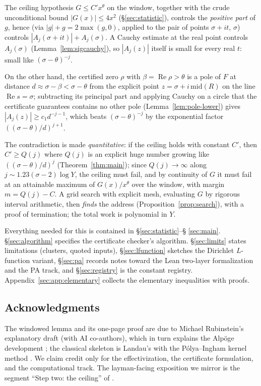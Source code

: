 \documentclass[11pt]{amsart}
\numberwithin{equation}{section}
\newcommand{\re}{\operatorname{Re}}
\newcommand{\Sig}{\sigma}
\begin{document}
The ceiling hypothesis $G \le C'x^{\theta}$ on the window, together with
the crude unconditional bound $|G(x)| \le 4x^2$ (\S\ref{sec:statistic}),
controls the \emph{positive part} of $g$, hence (via
$|g| + g = 2\max(g,0)$, applied to the pair of points
$\Sig+it$, $\Sig$) controls $|A_j(\Sig+it)| + A_j(\Sig)$.
A Cauchy estimate at the real point controls $A_j(\Sig)$
(Lemma~\ref{lem:sigcauchy}), so $|A_j(z)|$ itself is small for every real
$t$: small like $(\Sig-\theta)^{-j}$.

On the other hand, the certified zero $\rho$ with $\beta = \re\rho > \theta$
is a pole of $F$ at distance $d \approx \Sig - \beta < \Sig - \theta$ from
the explicit point $z = \Sig + i\,\mathrm{mid}(R)$ on the line
$\re s = \Sig$; subtracting its principal part and applying Cauchy on a
circle that the certificate guarantees contains no other pole
(Lemma~\ref{lem:pole-lower}) gives $|A_j(z)| \ge c_1 d^{-j-1}$, which
beats $(\Sig-\theta)^{-j}$ by the exponential factor
$((\Sig-\theta)/d)^{j+1}$.

The contradiction is made \emph{quantitative}: if the ceiling holds with
constant $C'$, then $C' \ge Q(j)$ where $Q(j)$ is an explicit huge number
growing like $((\Sig-\theta)/d)^{j}$ (Theorem~\ref{thm:main}); since $Q(j)
\to \infty$ along $j \sim 1.23(\Sig-2)\log Y$, the ceiling must fail, and
by continuity of $G$ it must fail at an attainable maximum of $G(x)/x^\theta$
over the window, with margin $m = Q(j) - C$. A grid search with explicit
mesh, evaluating $G$ by rigorous interval arithmetic, then \emph{finds}
the address (Proposition~\ref{prop:search}), with a proof of termination;
the total work is polynomial in $Y$.

Everything needed for this is contained in \S\ref{sec:statistic}--\S
\ref{sec:main}. \S\ref{sec:algorithm} specifies the certificate checker's
algorithm. \S\ref{sec:limits} states limitations (clusters, quoted
inputs), \S\ref{sec:lfunction} sketches the Dirichlet $L$-function
variant, \S\ref{sec:pa} records notes toward the Lean two-layer
formalization and the PA track, and \S\ref{sec:registry} is the constant
registry. Appendix~\ref{sec:app:elementary} collects the elementary
inequalities with proofs.

\subsection{Acknowledgments}

The windowed lemma and its one-page proof are due to Michael Rubinstein's
explanatory draft \cite{Rub26} (with AI co-authors), which in turn
explains the Alp\"oge development \cite{Alp26}; the classical skeleton is
Landau's \cite{Lan05} with the P\'olya--Ingham kernel method
\cite{Ing32}. We claim credit only for the effectivization, the
certificate formulation, and the computational track. The layman-facing
exposition we mirror is the segment ``Step two: the ceiling'' of
\cite{RieVideo}.
\end{document}
